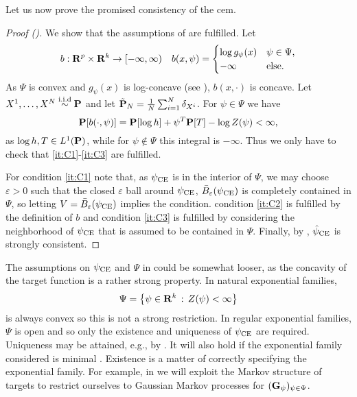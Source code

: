Let us now prove the promised consistency of the \acrshort{cem}.
\begin{proof}[Proof ()]
    We show that the assumptions of  are fulfilled. Let
    \begin{align*}
        b: \R^{p}\times \R^{k} \to [-\infty, \infty) && b(x, \psi) = \begin{cases}
            \log g_{\psi}(x) & \psi \in \Psi, \\
            - \infty & \text{else.}
        \end{cases} 
    \end{align*}
    As $\Psi$ is convex and $g_{\psi}(x)$ is log-concave (see ), $b(x, \cdot)$ is concave. Let $X^{1}, \dots, X^{N} \iid \P$ and let $\tilde{\P}_{N} = \frac{1}{N} \sum_{i = 1}^N \delta_{X^{i}}$. For $\psi \in \Psi$ we have
    $$
    \P [b(\cdot, \psi)] = \P [\log h] + \psi^{T}\P[T] - \log Z(\psi) < \infty,
    $$
    as $\log h, T \in L^{1}(\P)$, while for $\psi \notin \Psi$ this integral is $-\infty$. Thus we only have to check that \ref{it:C1}-\ref{it:C3} are fulfilled. 
    
    For condition \ref{it:C1} note that, as $\pce$ is in the interior of $\Psi$, we may choose $\varepsilon > 0$ such that the closed $\varepsilon$ ball around $\pce$, $\bar B_{\varepsilon} (\pce)$ is completely contained in $\Psi$, so letting $V = \bar B_{\varepsilon} (\pce)$ implies the condition. condition \ref{it:C2} is fulfilled by the definition of $b$ and condition \ref{it:C3} is fulfilled by considering the neighborhood of $\pce$ that is assumed to be contained in $\Psi$. Finally, by , $\hpce$ is strongly consistent.
\end{proof}

The assumptions on $\pce$ and $\Psi$ in  could be somewhat looser, as the concavity of the target function is a rather strong property. In natural exponential families, 
$$
\Psi = \left\{ \psi \in \R^{k} \,:\, Z(\psi) < \infty \right\}
$$
is always convex so this is not a strong restriction. In regular exponential families, $\Psi$ is open and so only the existence and uniqueness of $\pce$ are required. Uniqueness may be attained, e.g., by . It will also hold if the exponential family considered is minimal \citep[Corollary 2.5]{Brown1986Fundamentals}. Existence is a matter of correctly specifying the exponential family. For example, in  we will exploit the Markov structure of targets to restrict ourselves to Gaussian Markov processes for $(\G_{\psi})_{\psi \in \Psi}$. 


